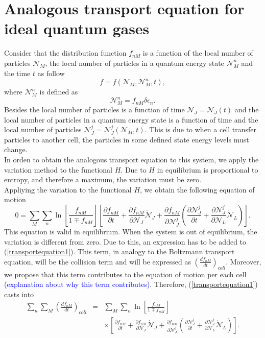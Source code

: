\documentclass{article}
\begin{document}
\section{Analogous transport equation for ideal quantum gases}
Consider that the distribution function $f_{nM}$ is a function of the local number of particles $\mathcal{N}_M$, the local number of particles in a quantum energy state $\mathcal{N}_{M}^{n}$ and the time $t$ as follow
\begin{equation}
    f=f(\mathcal{N}_M,\mathcal{N}_M^{n},t),
\end{equation}
where $\mathcal{N}_{M}^{n}$ is defined as
\begin{equation}
    \mathcal{N}_{M}^{n}= f_{nM} \delta \epsilon_n.
\end{equation}
Besides the local number of particles is a function of time $\mathcal{N}_J=\mathcal{N}_J(t)$ and the local number of particles in a quantum energy state is a function of time and the local number of particles $\mathcal{N}_J^{j}=\mathcal{N}_J^{j}(\mathcal{N}_M,t)$. This is due to when a cell transfer particles to another cell, the particles in some defined state energy levels must change.\\
In orden to obtain the analogous transport equation to this system, we apply the variation method to the functional $H$. Due to $H$ in equilibrium is proportional to entropy, and therefore a maximum, the variation must be zero.\\
Appliying the variation to the functional $H$, we obtain the following equation of motion
\begin{equation}
    0=\sum_M \sum_n \ln \left[ \frac{f_{nM}}{1\mp f_{nM}} \right] \left[ \frac{\partial f_{nM}}{\partial t}+\frac{\partial f_{nM}}{\partial \mathcal{N}_J}\dot{\mathcal{N}}_J+\frac{\partial f_{nM}}{\partial \mathcal{N}_J^{j}}\left( \frac{\partial \mathcal{N}_J^{j}}{\partial t}+\frac{\partial \mathcal{N}_J^{j}}{\partial \mathcal{N}_L}\dot{\mathcal{N}}_L \right) \right]. \label{transportequation1}
\end{equation}
This equation is valid in equilibrium. When the system is out of equilibrium, the variation is different from zero. Due to this, an expression has to be added to (\ref{transportequation1}). This term, in analogy to the Boltzmann transport equation, will be the collision term and will be expressed as $\left( \frac{df_{nM}}{dt} \right)_{coll}$. Moreover, we propose that this term contributes to the equation of motion per each cell \textcolor{blue}{(explanation about why this term contributes)}. Therefore, (\ref{transportequation1}) casts into
\begin{eqnarray}
    \sum_n \sum_M\left( \frac{df_{nM}}{dt} \right)_{coll}&=&\sum_M \sum_n \ln \left[ \frac{f_{nM}}{1\mp f_{nM}} \right] \nonumber \\
    &&\times \left[ \frac{\partial f_{nM}}{\partial t}+\frac{\partial f_{nM}}{\partial \mathcal{N}_J}\dot{\mathcal{N}}_J+\frac{\partial f_{nM}}{\partial \mathcal{N}_J^{j}}\left( \frac{\partial \mathcal{N}_J^{j}}{\partial t}+\frac{\partial \mathcal{N}_J^{j}}{\partial \mathcal{N}_L}\dot{\mathcal{N}}_L \right) \right].  \nonumber \\ \label{transportequation2}
\end{eqnarray}
\end{document}
